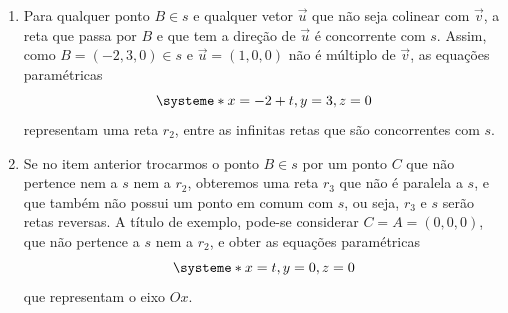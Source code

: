 \documentclass[12pt,a4paper]{article}
\begin{document}
\begin{enumerate}
\begin{enumerate}
\item Para qualquer ponto $B \in s$ e qualquer vetor $\vec{u}$ que não seja colinear com $\vec{v}$, a reta que passa por $B$ e que tem a direção de $\vec{u}$ é concorrente com $s$. Assim, como $B = (-2,3,0) \in s$ e $\vec{u} = (1,0,0)$ não é múltiplo de $\vec{v}$, as equações paramétricas
\[
\systeme*{
x = -2 + t,
y = 3,
z = 0
}
\]
representam uma reta $r_2$, entre as infinitas retas que são concorrentes com $s$.

\item Se no item anterior trocarmos o ponto $B \in s$ por um ponto $C$ que não pertence nem a $s$ nem a $r_2$, obteremos uma reta $r_3$ que não é paralela a $s$, e que também não possui um ponto em comum com $s$, ou seja, $r_3$ e $s$ serão retas reversas. A título de exemplo, pode-se considerar $C = A = (0,0,0)$, que não pertence a $s$ nem a $r_2$, e obter as equações paramétricas
\[
\systeme*{
x = t,
y = 0,
z = 0
}
\]
que representam o eixo $Ox$.
\end{enumerate}
\end{enumerate}
\end{document}
